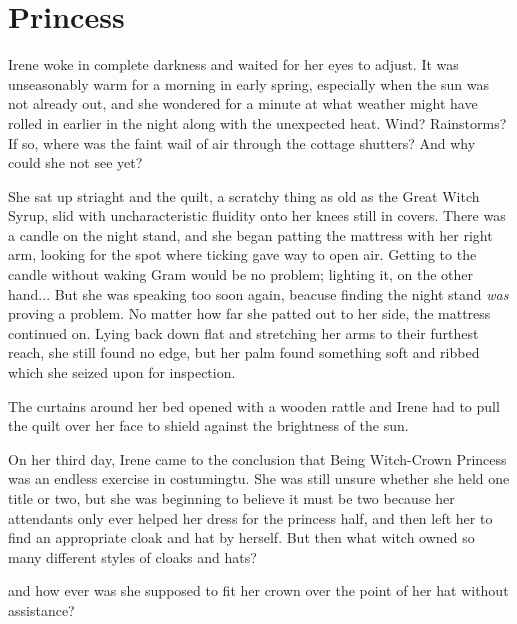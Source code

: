 \documentclass[../FGP.tex]{subfiles}
\begin{document}
\section{Princess}
\begin{fragment}
Irene woke in complete darkness and waited for her eyes to adjust. It was unseasonably warm for a morning in early spring, especially when the sun was not already out, and she wondered for a minute at what weather might have rolled in earlier in the night along with the unexpected heat. Wind? Rainstorms? If so, where was the faint wail of air through the cottage shutters? And why could she not see yet?

She sat up striaght and the quilt, a scratchy thing as old as the Great Witch Syrup, slid with uncharacteristic fluidity onto her knees still in covers.  There was a candle on the night stand, and she began patting the mattress with her right arm, looking for the spot where ticking gave way to open air. Getting to the candle without waking Gram would be no problem; lighting it, on the other hand... But she was speaking too soon again, beacuse finding the night stand \emph{was} proving a problem. No matter how far she patted out to her side, the mattress continued on. Lying back down flat and stretching her arms to their furthest reach, she still found no edge, but her palm found something soft and ribbed which she seized upon for inspection. 

The curtains around her bed opened with a wooden rattle and Irene had to pull the quilt over her face to shield against the brightness of the sun. 





\end{fragment}
\begin{fragment}
On her third day, Irene came to the conclusion that Being Witch-Crown Princess was an endless exercise in costumingtu. She was still unsure whether she held one title or two, but she was beginning to believe it must be two because her attendants only ever helped her dress for the princess half, and then left her to find an appropriate cloak and hat by herself. But then what witch owned so many different styles of cloaks and hats?

and how ever was she supposed to fit her crown over the point of her hat without assistance?
\end{fragment}
\end{document}
